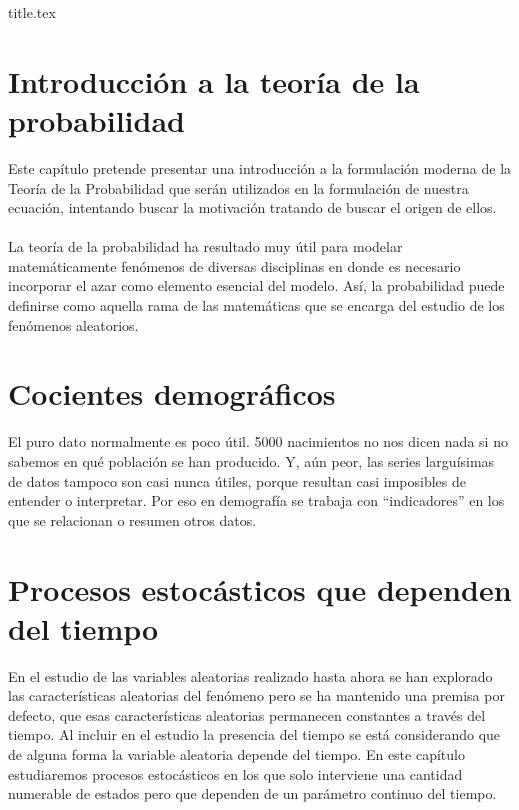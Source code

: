 \documentclass[a4paper,11pt]{book}
\begin{document}
\frontmatter
{title.tex}

\clearpage
\thispagestyle{empty}

\tableofcontents

\mainmatter
\chapter{Introducción a la teoría de la probabilidad}
    Este capítulo pretende presentar una introducción a la formulación moderna de la Teoría de la Probabilidad que serán utilizados en la formulación de nuestra ecuación, intentando buscar la motivación tratando de buscar el origen de ellos.\\\\
    La teoría de la probabilidad ha resultado muy útil para modelar
    matemáticamente fenómenos de diversas disciplinas en donde es necesario incorporar el azar como elemento esencial del modelo. Así, la probabilidad puede definirse como
    aquella rama de las matemáticas que se encarga del estudio de los fenómenos
    aleatorios.
    
    
    
    
    
    

\chapter{Cocientes demográficos}
    El puro dato normalmente es poco útil. 5000 nacimientos no nos dicen nada si no sabemos en qué población se han producido. Y, aún peor, las series larguísimas de datos tampoco son casi nunca útiles, porque resultan casi imposibles de entender o interpretar. Por eso en demografía se trabaja con “indicadores” en los que se relacionan o resumen otros datos.
    
    

\chapter{Procesos estocásticos que dependen del tiempo}
    En el estudio de las variables aleatorias realizado hasta ahora se han explorado las características aleatorias del fenómeno pero se ha mantenido una premisa por defecto, que esas
    características aleatorias permanecen constantes a través del tiempo. Al incluir en el estudio la presencia del tiempo se está considerando que de alguna forma la variable aleatoria depende del tiempo.
    En este capítulo estudiaremos procesos estocásticos en los que solo interviene una cantidad numerable de estados pero que dependen de un parámetro continuo del tiempo.
    
    
    
    
\end{document}

